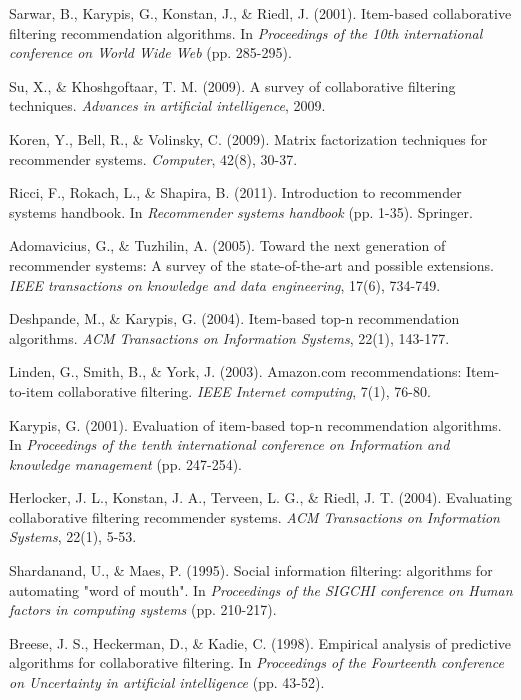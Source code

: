 \documentclass[12pt,a4paper]{article}
\begin{document}
\begin{thebibliography}{15}

Sarwar, B., Karypis, G., Konstan, J., \& Riedl, J. (2001). Item-based collaborative filtering recommendation algorithms. In \textit{Proceedings of the 10th international conference on World Wide Web} (pp. 285-295).

Su, X., \& Khoshgoftaar, T. M. (2009). A survey of collaborative filtering techniques. \textit{Advances in artificial intelligence}, 2009.

Koren, Y., Bell, R., \& Volinsky, C. (2009). Matrix factorization techniques for recommender systems. \textit{Computer}, 42(8), 30-37.

Ricci, F., Rokach, L., \& Shapira, B. (2011). Introduction to recommender systems handbook. In \textit{Recommender systems handbook} (pp. 1-35). Springer.

Adomavicius, G., \& Tuzhilin, A. (2005). Toward the next generation of recommender systems: A survey of the state-of-the-art and possible extensions. \textit{IEEE transactions on knowledge and data engineering}, 17(6), 734-749.

Deshpande, M., \& Karypis, G. (2004). Item-based top-n recommendation algorithms. \textit{ACM Transactions on Information Systems}, 22(1), 143-177.

Linden, G., Smith, B., \& York, J. (2003). Amazon.com recommendations: Item-to-item collaborative filtering. \textit{IEEE Internet computing}, 7(1), 76-80.

Karypis, G. (2001). Evaluation of item-based top-n recommendation algorithms. In \textit{Proceedings of the tenth international conference on Information and knowledge management} (pp. 247-254).

Herlocker, J. L., Konstan, J. A., Terveen, L. G., \& Riedl, J. T. (2004). Evaluating collaborative filtering recommender systems. \textit{ACM Transactions on Information Systems}, 22(1), 5-53.

Shardanand, U., \& Maes, P. (1995). Social information filtering: algorithms for automating "word of mouth". In \textit{Proceedings of the SIGCHI conference on Human factors in computing systems} (pp. 210-217).

Breese, J. S., Heckerman, D., \& Kadie, C. (1998). Empirical analysis of predictive algorithms for collaborative filtering. In \textit{Proceedings of the Fourteenth conference on Uncertainty in artificial intelligence} (pp. 43-52).


\end{thebibliography}
\end{document}
